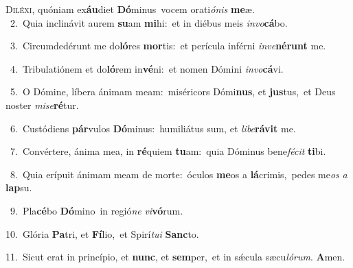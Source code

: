 \lettrine{\initial\textcolor{\initialcolor}{D}}{iléxi,} quóniam ex\-\textbf{áu}\-diet \textbf{Dó}\-minus~\star vocem orati\-\textit{ó}\-\textit{nis} \textbf{me}\-æ.\\
{\numbfont\textcolor{\numbcolor}{~2.}}~Quia inclinávit aurem \textbf{su}\-am \textbf{mi}\-hi:~\star et in diébus meis \textit{in}\-\textit{vo}\textbf{cá}bo.\par
{\numbfont\textcolor{\numbcolor}{~3.}}~Circumdedérunt me do\-\textbf{ló}\-res \textbf{mor}\-tis:~\star et perícula inférni \textit{in}\-\textit{ve}\textbf{né}\textbf{runt} me.\par
{\numbfont\textcolor{\numbcolor}{~4.}}~Tribulatiónem et do\-\textbf{ló}\-rem in\-\textbf{vé}\-ni:~\star et nomen Dómini \textit{in}\-\textit{vo}\textbf{cá}vi.\par
{\numbfont\textcolor{\numbcolor}{~5.}}~O Dómine, líbera ánimam meam:~\dagger miséricors Dómi\-\textbf{nus}\-, et \textbf{jus}\-tus,~\star et Deus noster \textit{mi}\-\textit{se}\textbf{ré}tur.\par
{\numbfont\textcolor{\numbcolor}{~6.}}~Custódiens \textbf{pár}\-vulos \textbf{Dó}\-minus:~\star humiliátus sum, et \textit{li}\-\textit{be}\textbf{rá}\textbf{vit} me.\par
{\numbfont\textcolor{\numbcolor}{~7.}}~Convértere, ánima mea, in \textbf{ré}\-quiem \textbf{tu}\-am:~\star quia Dóminus bene\-\textit{fé}\-\textit{cit} \textbf{ti}\-bi.\par
{\numbfont\textcolor{\numbcolor}{~8.}}~Quia erípuit ánimam meam de morte:~\dagger óculos \textbf{me}\-os a \textbf{lá}\-crimis,~\star pedes me\textit{os} \textit{a} \textbf{lap}\-su.\par
{\numbfont\textcolor{\numbcolor}{~9.}}~Pla\-\textbf{cé}\-bo \textbf{Dó}\-mino~\star in regió\textit{ne} \textit{vi}\-\textbf{vó}rum.\par
{\numbfont\textcolor{\numbcolor}{10.}}~Glória \textbf{Pa}\-tri, et \textbf{Fí}\-lio,~\star et Spirí\-\textit{tu}\-\textit{i} \textbf{Sanc}\-to.\par
{\numbfont\textcolor{\numbcolor}{11.}}~Sicut erat in princípio, et \textbf{nunc}\-, et \textbf{sem}\-per,~\star et in sǽcula sæcu\-\textit{ló}\-\textit{rum}. \textbf{A}\-men.\par
